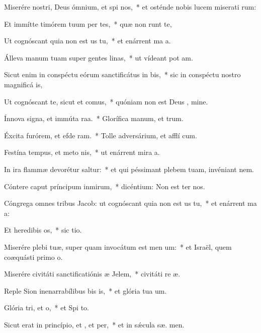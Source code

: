 \item Miserére nostri, Deus ómnium, et spi nos,~* et osténde nobis lucem miserati rum:
\item Et immítte timórem tuum per tes,~* quæ non runt te,
\item Ut cognóscant quia non est us  tu,~* et enárrent ma a.
\item Álleva manum tuam super gentes linas,~* ut vídeant pot am.
\item Sicut enim in conspéctu eórum sanctificátus  in bis,~* sic in conspéctu nostro magnificá  is,
\item Ut cognóscant te, sicut et  comus,~* quóniam non est Deus  , mine.
\item Ínnova signa, et immúta raa.~* Glorífica manum, et  trum.
\item Éxcita furórem, et efde ram.~* Tolle adversárium, et afflí cum.
\item Festína tempus, et meto nis,~* ut enárrent mira a.
\item In ira flammæ devorétur  saltur:~* et qui péssimant plebem tuam, invéniant nem.
\item Cóntere caput príncipum inmirum,~* dicéntium: Non est  ter nos.
\item Cóngrega omnes tribus Jacob: ut cognóscant quia non est us  tu,~* et enárrent ma a:
\item Et heredibis os,~* sic  tio.
\item Miserére plebi tuæ, super quam invocátum est men um:~* et Israël, quem coæquásti primo o.
\item Miserére civitáti sanctificatiónis æ Jelem,~* civitáti re æ.
\item Reple Sion inenarrabílibus bis is,~* et glória tua  um.
\item Glória tri, et o,~* et Spi to.
\item Sicut erat in princípio, et , et per,~* et in sǽcula sæ. men.

